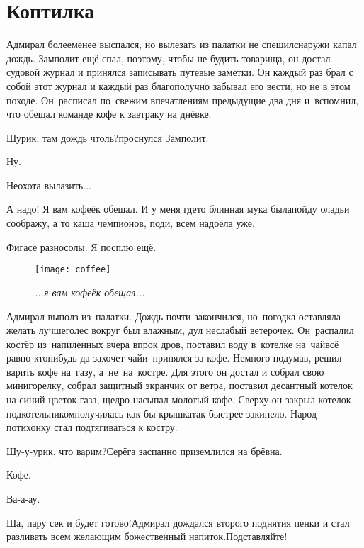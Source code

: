 \chapter{Коптилка}
\vepsianrose

Адмирал более\sdash менее выспался, но вылезать из палатки не спешил\mdash снаружи капал дождь. Замполит ещё спал, поэтому, чтобы не будить товарища, он достал судовой журнал и принялся записывать путевые заметки. Он каждый раз брал с собой этот журнал и каждый раз благополучно забывал его вести, но не в этом походе. Он~расписал по~свежим впечатлениям предыдущие два дня и~вспомнил, что обещал команде кофе к завтраку на днёвке.

\diagdash Шурик, там дождь чтоль?\mdash проснулся Замполит.

\diagdash Ну.

\diagdash Неохота вылазить$\ldots$

\diagdash А надо! Я вам кофеёк обещал. И у меня где\sdash то блинная мука была\mdash пойду оладьи соображу, а то каша чемпионов, поди, всем надоела уже.

\diagdash Фигасе разносолы. Я посплю ещё.

\newpage
\begin{wrapfigure}[13]{l}{0.5\textwidth}
	\centering
	\texttt{[image: coffee]}
	\caption{\small\textit{...я вам кофеёк обещал...}}
\end{wrapfigure}
Адмирал выполз из~палатки. Дождь почти закончился, но~погодка оставляла желать лучшего\mdash лес вокруг был влажным, дул неслабый ветерочек. Он~распалил костёр из~напиленных вчера впрок дров, поставил воду в~котелке на~чай\mdash всё равно кто\sdash нибудь да захочет чай\mdash и~принялся за кофе. Немного подумав, решил варить кофе на~газу, а~не~на~костре. Для этого он достал и собрал свою мини\sdash горелку, собрал защитный экранчик от ветра, поставил десантный котелок на синий цветок газа, щедро насыпал молотый кофе. Сверху он закрыл котелок подкотельником\mdash получилась как бы крышка\mdash так быстрее закипело. Народ потихонку стал подтягиваться к костру.

\diagdash Шу-у-урик, что варим?\mdash Серёга заспанно приземлился на брёвна.

\diagdash Кофе.

\diagdash Ва-а-ау.

\diagdash Ща, пару сек и будет готово!\mdash Адмирал дождался второго поднятия пенки и стал разливать всем желающим божественный напиток.\mdash Подставляйте!

